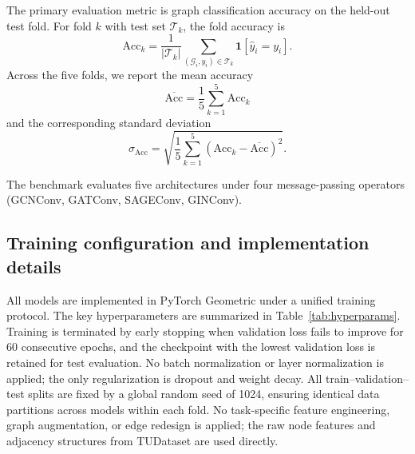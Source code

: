 The primary evaluation metric is graph classification accuracy on the held-out test fold. For fold $k$ with test set $\mathcal{T}_k$, the fold accuracy is
\begin{equation}
\mathrm{Acc}_k = \frac{1}{|\mathcal{T}_k|}\sum_{(\mathcal{G}_i,y_i)\in\mathcal{T}_k}\mathbf{1}\!\left[\hat{y}_i = y_i\right].
\end{equation}
Across the five folds, we report the mean accuracy
\begin{equation}
\overline{\mathrm{Acc}} = \frac{1}{5}\sum_{k=1}^{5}\mathrm{Acc}_k
\end{equation}
and the corresponding standard deviation
\begin{equation}
\sigma_{\mathrm{Acc}} = \sqrt{\frac{1}{5}\sum_{k=1}^{5}\left(\mathrm{Acc}_k-\overline{\mathrm{Acc}}\right)^2 }.
\end{equation}

The benchmark evaluates five architectures under four message-passing operators (GCNConv, GATConv, SAGEConv, GINConv).

\subsection{Training configuration and implementation details}

All models are implemented in PyTorch Geometric \cite{fey2019fast} under a unified training protocol. The key hyperparameters are summarized in Table~\ref{tab:hyperparams}. Training is terminated by early stopping when validation loss fails to improve for 60 consecutive epochs, and the checkpoint with the lowest validation loss is retained for test evaluation. No batch normalization or layer normalization is applied; the only regularization is dropout and weight decay. All train--validation--test splits are fixed by a global random seed of 1024, ensuring identical data partitions across models within each fold. No task-specific feature engineering, graph augmentation, or edge redesign is applied; the raw node features and adjacency structures from TUDataset are used directly.

